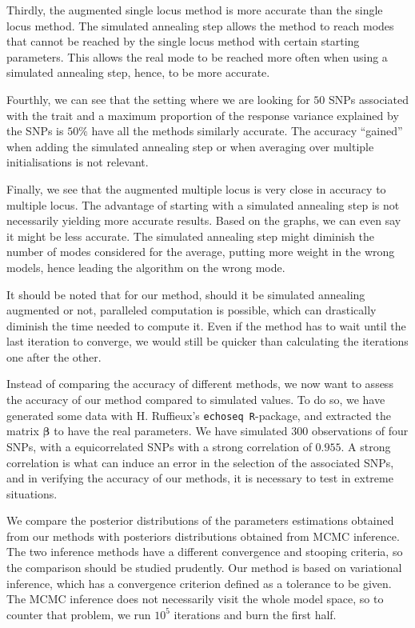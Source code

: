 \documentclass[a4paper, 11pt]{report}
\numberwithin{equation}{chapter}
\begin{document}
Thirdly, the augmented single locus method is more accurate than the single locus method. The simulated annealing step allows the method to reach modes that cannot be reached by the single locus method with certain starting parameters. This allows the real mode to be reached more often when using a simulated annealing step, hence, to be more accurate.

Fourthly, we can see that the setting where we are looking for $50$ SNPs associated with the trait and a maximum proportion of the response variance explained by the SNPs is $50\%$ have all the methods similarly accurate. The accuracy ``gained'' when adding the simulated annealing step or when averaging over multiple initialisations is not relevant. 

Finally, we see that the augmented multiple locus is very close in accuracy to multiple locus. The advantage of starting with a simulated annealing step is not necessarily yielding more accurate results. Based on the graphs, we can even say it might be less accurate. The simulated annealing step might diminish the number of modes considered for the average, putting more weight in the wrong models, hence leading the algorithm on the wrong mode.

It should be noted that for our method, should it be simulated annealing augmented or not, paralleled computation is possible, which can drastically diminish the time needed to compute it. Even if the method has to wait until the last iteration to converge, we would still be quicker than calculating the iterations one after the other.

Instead of comparing the accuracy of different methods, we now want to assess the accuracy of our method compared to simulated values. To do so, we have generated some data with H. Ruffieux's \texttt{echoseq R}-package, and extracted the matrix $\boldsymbol{\beta}$ to have the real parameters. We have simulated $300$ observations of four SNPs, with a equicorrelated SNPs with a strong correlation of $0.955$. A strong correlation is what can induce an error in the selection of the associated SNPs, and in verifying the accuracy of our methods, it is necessary to test in extreme situations.

We compare the posterior distributions of the parameters estimations obtained from our methods with posteriors distributions obtained from MCMC inference. The two inference methods have a different convergence and stooping criteria, so the comparison should be studied prudently. Our method is based on variational inference, which has a convergence criterion defined as a tolerance to be given. The MCMC inference does not necessarily visit the whole model space, so to counter that problem, we run $10^5$ iterations and burn the first half.
\end{document}
